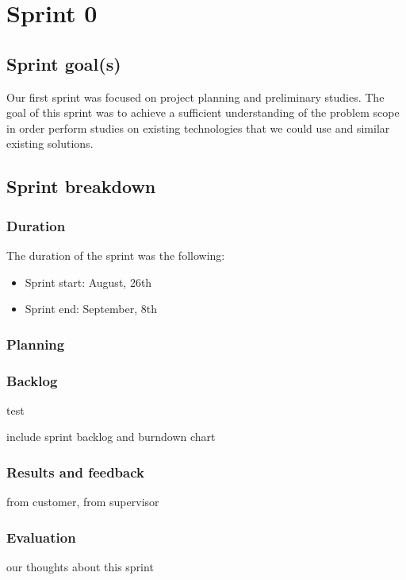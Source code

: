 

\chapter{Sprint 0}
\label{Sprint0}

\section{Sprint goal(s)}

Our first sprint was focused on project planning and preliminary studies.
The goal of this sprint was to achieve a sufficient understanding of the problem scope in order
perform studies on existing technologies that we could use and similar existing solutions.

\section{Sprint breakdown}
\subsection{Duration}
The duration of the sprint was the following:
\begin{itemize}
\item Sprint start: August, 26th
\item Sprint end: September, 8th
\end{itemize}

\subsection{Planning} 

\subsection{Backlog}

\begin{description}
\item[test]
\end{description}


include sprint backlog and burndown chart
\subsection{Results and feedback}
from customer, from supervisor
\subsection{Evaluation}
our thoughts about this sprint






